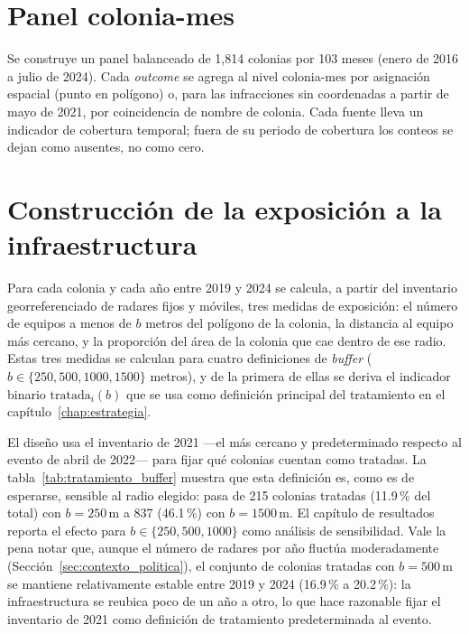 \section{Panel colonia-mes}

Se construye un panel balanceado de 1{,}814 colonias por 103 meses (enero de
2016 a julio de 2024). Cada \emph{outcome} se agrega al nivel colonia-mes por
asignación espacial (punto en polígono) o, para las infracciones sin
coordenadas a partir de mayo de 2021, por coincidencia de nombre de colonia.
Cada fuente lleva un indicador de cobertura temporal; fuera de su periodo de
cobertura los conteos se dejan como ausentes, no como cero.

\section{Construcción de la exposición a la infraestructura}
\label{sec:datos_exposicion}

Para cada colonia y cada año entre 2019 y 2024 se calcula, a partir del
inventario georreferenciado de radares fijos y móviles, tres medidas de
exposición: el número de equipos a menos de $b$ metros del polígono de la
colonia, la distancia al equipo más cercano, y la proporción del área de la
colonia que cae dentro de ese radio. Estas tres medidas se calculan para
cuatro definiciones de \emph{buffer} ($b \in \{250, 500, 1000, 1500\}$
metros), y de la primera de ellas se deriva el indicador binario
$\text{tratada}_i(b)$ que se usa como definición principal del tratamiento en
el capítulo~\ref{chap:estrategia}.

El diseño usa el inventario de 2021 —el más cercano y predeterminado respecto
al evento de abril de 2022— para fijar qué colonias cuentan como tratadas. La
tabla~\ref{tab:tratamiento_buffer} muestra que esta definición es, como es de
esperarse, sensible al radio elegido: pasa de 215 colonias tratadas (11.9\,\%
del total) con $b=250$\,m a 837 (46.1\,\%) con $b=1500$\,m. El capítulo de
resultados reporta el efecto para $b \in \{250, 500, 1000\}$ como análisis de
sensibilidad. Vale la pena notar que, aunque el número de radares por año
fluctúa moderadamente (Sección~\ref{sec:contexto_politica}), el conjunto de
colonias tratadas con $b=500$\,m se mantiene relativamente estable entre 2019
y 2024 (16.9\,\% a 20.2\,\%): la infraestructura se reubica poco de un año a
otro, lo que hace razonable fijar el inventario de 2021 como definición de
tratamiento predeterminada al evento.

